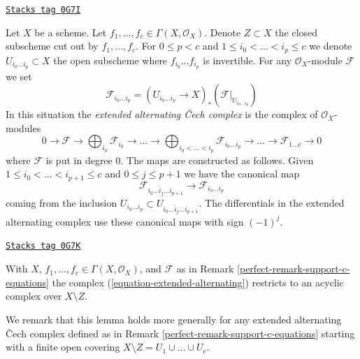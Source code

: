 \begin{remark}
\label{perfect-remark-support-c-equations}
\href{https://stacks.math.columbia.edu/tag/0G7I}{\texttt{Stacks tag 0G7I}}

Let $X$ be a scheme. Let $f_1, \ldots, f_c \in \Gamma(X, \mathcal{O}_X)$.
Denote $Z \subset X$ the closed subscheme cut out by $f_1, \ldots, f_c$.
For $0 \leq p < c$ and $1 \leq i_0 < \ldots < i_p \leq c$ we denote
$U_{i_0 \ldots i_p} \subset X$ the open subscheme where
$f_{i_0} \ldots f_{i_p}$ is invertible. For any $\mathcal{O}_X$-module
$\mathcal{F}$ we set
$$
\mathcal{F}_{i_0 \ldots i_p} =
(U_{i_0 \ldots i_p} \to X)_*(\mathcal{F}|_{U_{i_0 \ldots i_p}})
$$
In this situation the {\it extended alternating {\v C}ech complex}
is the complex of $\mathcal{O}_X$-modules
\begin{equation}
\label{equation-extended-alternating}
0 \to \mathcal{F} \to
\bigoplus\nolimits_{i_0} \mathcal{F}_{i_0} \to
\ldots \to
\bigoplus\nolimits_{i_0 < \ldots < i_p} \mathcal{F}_{i_0 \ldots i_p} \to
\ldots \to \mathcal{F}_{1 \ldots c} \to 0
\end{equation}
where $\mathcal{F}$ is put in degree $0$. The maps are constructed as
follows. Given
$1 \leq i_0 < \ldots < i_{p + 1} \leq c$ and $0 \leq j \leq p + 1$ we
have the canonical map
$$
\mathcal{F}_{i_0 \ldots \hat i_j \ldots i_{p + 1}} \to
\mathcal{F}_{i_0 \ldots i_p}
$$
coming from the inclusion
$U_{i_0 \ldots i_p} \subset U_{i_0 \ldots \hat i_j \ldots i_{p + 1}}$.
The differentials in the extended alternating complex use these
canonical maps with sign $(-1)^j$.
\end{remark}

\begin{lemma}
\label{perfect-lemma-extended-alternating-zero}
\href{https://stacks.math.columbia.edu/tag/0G7K}{\texttt{Stacks tag 0G7K}}

With $X$, $f_1, \ldots, f_c \in \Gamma(X, \mathcal{O}_X)$, and
$\mathcal{F}$ as in Remark \ref{perfect-remark-support-c-equations}
the complex (\ref{equation-extended-alternating}) restricts to an acyclic
complex over $X \setminus Z$.
\end{lemma}

We remark that this lemma holds more generally for any
extended alternating {\v C}ech complex defined as in
Remark \ref{perfect-remark-support-c-equations} starting with a finite
open covering $X \setminus Z = U_1 \cup \ldots \cup U_c$.

